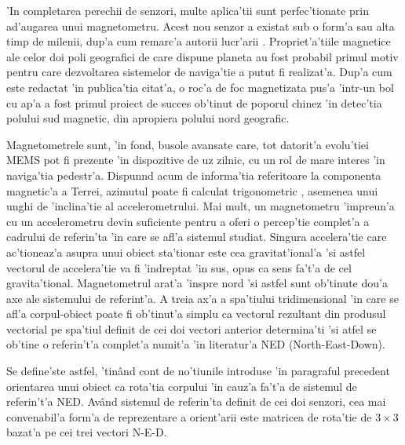 \documentclass[12pt,a4paper,twoside]{report}
\begin{document}
\vspace{5px}

'In completarea perechii de senzori, multe aplica'tii sunt perfec'tionate prin ad'augarea unui magnetometru. Acest nou senzor a existat sub o form'a sau alta timp de milenii, dup'a cum remarc'a autorii lucr'arii \cite{5507301}. Propriet'a'tiile magnetice ale celor doi poli geografici de care dispune planeta au fost probabil primul motiv pentru care dezvoltarea sistemelor de naviga'tie a putut fi realizat'a. Dup'a cum este redactat 'in publica'tia citat'a, o roc'a de foc magnetizata pus'a 'intr-un bol cu ap'a a fost primul proiect de succes ob'tinut de poporul chinez 'in detec'tia polului sud magnetic, din apropiera polului nord geografic.  

\vspace{5px}

Magnetometrele sunt, 'in fond, busole avansate care, tot datorit'a evolu'tiei MEMS pot fi prezente 'in dispozitive de uz zilnic, cu un rol de mare interes 'in naviga'tia pedestr'a. Dispun\ia nd acum de informa'tia referitoare la componenta magnetic'a a Terrei, azimutul poate fi calculat trigonometric \cite{5507301}, asemenea unui unghi de 'inclina'tie al accelerometrului. Mai mult, un magnetometru 'impreun'a cu un accelerometru devin suficiente pentru a oferi o percep'tie complet'a a cadrului de referin'ta 'in care se afl'a sistemul studiat. Singura accelera'tie care ac'tioneaz'a asupra unui obiect sta'tionar este cea gravitat'ional'a 'si astfel vectorul de accelera'tie va fi 'indreptat 'in sus, opus ca sens fa't'a de cel gravita'tional. Magnetometrul arat'a 'inspre nord 'si astfel sunt ob'tinute dou'a axe ale sistemului de referint'a. A treia ax'a a spa'tiului tridimensional 'in care se afl'a corpul-obiect poate fi ob'tinut'a simplu ca vectorul rezultant din produsul vectorial pe spa'tiul definit de cei doi vectori anterior determina'ti 'si atfel se ob'tine o referin't'a complet'a numit'a 'in literatur'a NED (North-East-Down).


\vspace{5px}

Se define'ste astfel, 'tin\^{a}nd cont de no'tiunile introduse 'in paragraful precedent orientarea unui obiect ca rota'tia corpului 'in cauz'a fa't'a de sistemul de referin't'a NED. Av\^{a}nd sistemul de referin'ta definit de cei doi senzori, cea mai convenabil'a form'a de reprezentare a orient'arii este matricea de rota'tie de $3\times3$ bazat'a pe cei trei vectori N-E-D. 

\vspace{5px}
\end{document}
